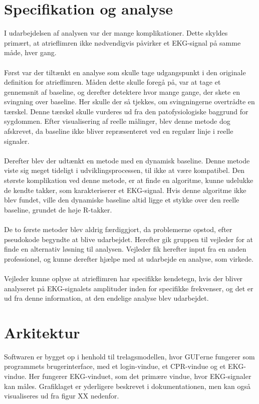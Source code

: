 \section{Specifikation og analyse}
I udarbejdelsen af analysen var der mange komplikationer. Dette skyldes primært, at atrieflimren ikke nødvendigvis påvirker et EKG-signal på samme måde, hver gang.\\ \\
Først var der tiltænkt en analyse som skulle tage udgangspunkt i den originale definition for atrieflimren. Måden dette skulle foregå på, var at tage et gennemsnit af baseline, og derefter detektere hvor mange gange, der skete en svingning over baseline. Her skulle der så tjekkes, om svingningerne overtrådte en tærskel. Denne tærskel skulle vurderes ud fra den patofysiologiske baggrund for sygdommen. Efter visualisering af reelle målinger, blev denne metode dog afskrevet, da baseline ikke bliver repræsenteret ved en regulær linje i reelle signaler. \\ \\
Derefter blev der udtænkt en metode med en dynamisk baseline. Denne metode viste sig meget tideligt i udviklingsprocessen, til ikke at være kompatibel. Den største komplikation ved denne metode, er at finde en algoritme, kunne udelukke de kendte takker, som karakteriserer et EKG-signal. Hvis denne algoritme ikke blev fundet, ville den dynamiske baseline altid ligge et stykke over den reelle baseline, grundet de høje R-takker. \\ \\
De to første metoder blev aldrig færdiggjort, da problemerne opstod, efter pseudokode begyndte at blive udarbejdet. Herefter gik gruppen til vejleder for at finde en alternativ løsning til analysen. Vejleder fik herefter input fra en anden professionel, og kunne derefter hjælpe med at udarbejde en analyse, som virkede.\\ \\
Vejleder kunne oplyse at atrieflimren har specifikke kendetegn, hvis der bliver analyseret på EKG-signalets amplituder inden for specifikke frekvenser, og det er ud fra denne information, at den endelige analyse blev udarbejdet. 

\section{Arkitektur}
Softwaren er bygget op i henhold til trelagsmodellen, hvor GUI’erne fungerer som programmets brugerinterface, med et login-vindue, et CPR-vindue og et EKG-vindue. Her fungerer EKG-vinduet, som det primære vindue, hvor EKG-signaler kan måles. Grafiklaget er yderligere beskrevet i dokumentationen, men kan også visualiseres ud fra figur XX nedenfor.

